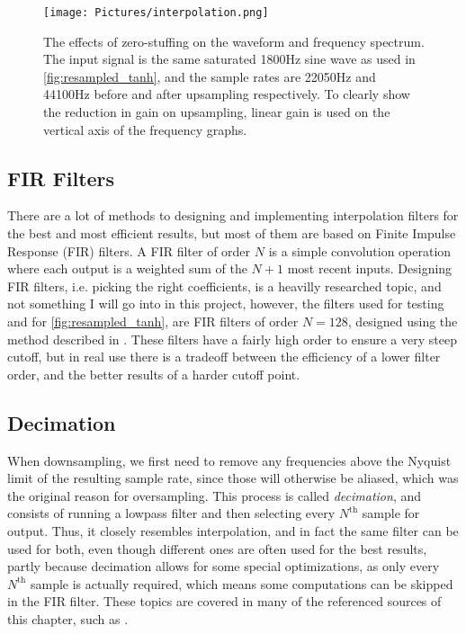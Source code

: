 \begin{figure}
  \centering
  \texttt{[image: Pictures/interpolation.png]}
  \caption{The effects of zero-stuffing on the waveform and frequency spectrum. The input signal is the same saturated
    1800Hz sine wave as used in \autoref{fig:resampled_tanh}, and the sample rates are 22050Hz and 44100Hz before and  after upsampling respectively. To clearly show the
    reduction in gain on upsampling, linear gain is used on the vertical axis of the frequency graphs.}
  \label{fig:interpolation}
\end{figure}

\subsection{FIR Filters}
\label{sec:fir_filters}

There are a lot of methods to designing and implementing interpolation filters for the best and most
efficient results, but most of them are based on Finite Impulse Response (FIR) filters. A FIR filter of order
$N$ is a simple convolution operation where each output is a weighted sum of the
$N + 1$ most recent inputs. Designing FIR filters, i.e. picking the right coefficients, is a
heavilly researched topic\autocite{kahles2019oversampling, SORIA2013, thomas2009}, and not something I will go into in this project, however,
the filters used for testing and for \autoref{fig:resampled_tanh}, are FIR filters of order $N = 128$,
designed using the method described in \autocite{fiir}. These filters have a fairly high order to
ensure a very steep cutoff, but in real use there is a tradeoff between the efficiency of a lower filter
order, and the better results of a harder cutoff point.

\subsection{Decimation}
\label{sec:decimation}

When downsampling, we first need to remove any frequencies above the Nyquist limit of the resulting sample
rate, since those will otherwise be aliased, which was the original reason for oversampling. This process is
called \emph{decimation}, and consists of running a lowpass filter and then selecting every
$N^\mathrm{th}$ sample for output. Thus, it closely resembles interpolation, and in fact the same
filter can be used for both, even though different ones are often used for the best results, partly because
decimation allows for some special optimizations, as only every $N^\mathrm{th}$ sample is actually
required, which means some computations can be skipped in the FIR filter. These topics are covered in many of
the referenced sources of this chapter, such as \autocite{kahles2019oversampling, SORIA2013, thomas2009}.


